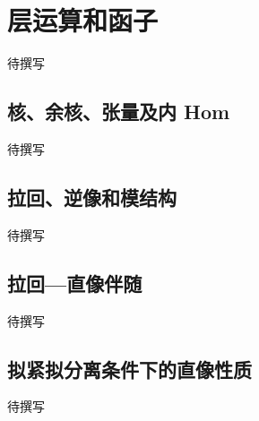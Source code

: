 
% 
% 

\section{层运算和函子}
\label{g5:sec:1302}

待撰写

\subsection{核、余核、张量及内 Hom}
\label{g5:subsec:1302:01}
待撰写

\subsection{拉回、逆像和模结构}
\label{g5:subsec:1302:02}
待撰写

\subsection{拉回—直像伴随}
\label{g5:subsec:1302:03}
待撰写

\subsection{拟紧拟分离条件下的直像性质}
\label{g5:subsec:1302:04}
待撰写
